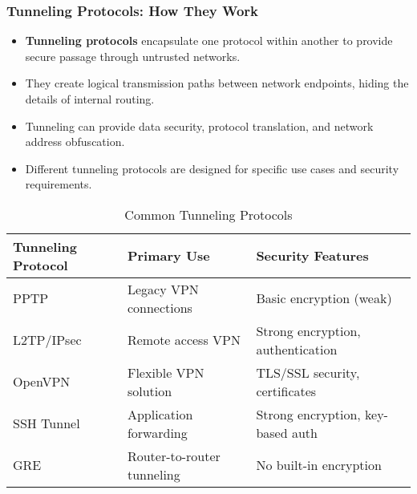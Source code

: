 \documentclass{beamer}
\begin{document}
\begin{frame}
    \frametitle{Tunneling Protocols: How They Work}
    \begin{itemize}
        \item \textbf{Tunneling protocols} encapsulate one protocol within another to provide secure passage through untrusted networks.
        \item They create logical transmission paths between network endpoints, hiding the details of internal routing.
        \item Tunneling can provide data security, protocol translation, and network address obfuscation.
        \item Different tunneling protocols are designed for specific use cases and security requirements.
    \end{itemize}

    \scriptsize
    \begin{table}
        \centering
        \begin{tabular}{|l|l|l|}
            \hline
            \textbf{Tunneling Protocol} & \textbf{Primary Use} & \textbf{Security Features} \\
            \hline
            PPTP & Legacy VPN connections & Basic encryption (weak) \\
            \hline
            L2TP/IPsec & Remote access VPN & Strong encryption, authentication \\
            \hline
            OpenVPN & Flexible VPN solution & TLS/SSL security, certificates \\
            \hline
            SSH Tunnel & Application forwarding & Strong encryption, key-based auth \\
            \hline
            GRE & Router-to-router tunneling & No built-in encryption \\
            \hline
        \end{tabular}
        \caption{Common Tunneling Protocols}
    \end{table}
\end{frame}
\end{document}
